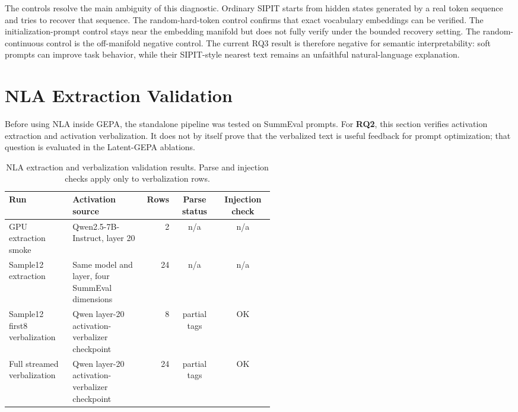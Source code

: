 \documentclass[12pt,a4paper,twoside,openright]{book}
\begin{document}
The controls resolve the main ambiguity of this diagnostic. Ordinary SIPIT
starts from hidden states generated by a real token sequence and tries to recover
that sequence. The random-hard-token control confirms that exact vocabulary
embeddings can be verified. The initialization-prompt control stays near the
embedding manifold but does not fully verify under the bounded recovery setting.
The random-continuous control is the off-manifold negative control. The current
RQ3 result is therefore negative for semantic interpretability: soft prompts can
improve task behavior, while their SIPIT-style nearest text remains an
unfaithful natural-language explanation.

\section{NLA Extraction Validation}
\label{sec:results-standalone-nla}

Before using NLA inside GEPA, the standalone pipeline was tested on SummEval
prompts. For \textbf{RQ2}, this section verifies activation extraction and
activation verbalization. It does not by itself prove that the verbalized text is
useful feedback for prompt optimization; that question is evaluated in the
Latent-GEPA ablations.

\begin{table}[!htb]
    \centering
    \scriptsize
    \begin{adjustbox}{width=\textwidth}
    \begin{tabular}{p{0.24\linewidth} p{0.28\linewidth} r c c}
        \toprule
        \textbf{Run} & \textbf{Activation source} & \textbf{Rows} & \textbf{Parse status} & \textbf{Injection check} \\
        \midrule
        GPU extraction smoke &
        Qwen2.5-7B-Instruct, layer 20 &
        2 & n/a & n/a \\
        Sample12 extraction &
        Same model and layer, four SummEval dimensions &
        24 & n/a & n/a \\
        Sample12 first8 verbalization &
        Qwen layer-20 activation-verbalizer checkpoint &
        8 & partial tags & OK \\
        Full streamed verbalization &
        Qwen layer-20 activation-verbalizer checkpoint &
        24 & partial tags & OK \\
        \bottomrule
    \end{tabular}
    \end{adjustbox}
    \caption{NLA extraction and verbalization validation results. Parse and
    injection checks apply only to verbalization rows.}
    \label{tab:standalone-nla-validation}
\end{table}
\end{document}
